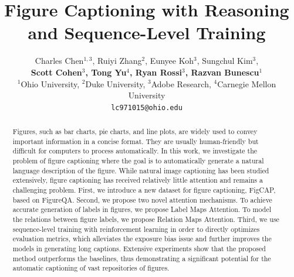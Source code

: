 \documentclass[11pt,a4paper]{article}
\title{Figure Captioning with Reasoning and Sequence-Level Training}
\author{Charles Chen$^{1,3}$, Ruiyi Zhang$^2$, Eunyee Koh$^3$, Sungchul Kim$^3$,\\ 
	\textbf{Scott Cohen$^3$, Tong Yu$^4$, Ryan Rossi$^3$, Razvan Bunescu$^1$}  \\
	$^1$Ohio University, $^2$Duke University, $^3$Adobe Research, $^4$Carnegie Mellon University \\
	{\tt lc971015@ohio.edu} \\}
\date{}
\begin{document}
\maketitle

\begin{abstract}
Figures, such as bar charts, pie charts, and line plots, are widely used to convey important information in a concise format. They are usually human-friendly but difficult for computers to process automatically. 
In this work, we investigate the problem of figure captioning where the goal is to automatically generate a natural language description of the figure. 
While natural image captioning has been studied extensively, figure captioning has received relatively little attention and remains a challenging problem.
First, we introduce a new dataset for figure captioning, FigCAP, based on FigureQA. Second, we propose two novel attention mechanisms. To achieve accurate generation of labels in figures, we propose Label Maps Attention. To model the relations between figure labels, we propose Relation Maps Attention.  Third, we use sequence-level training with reinforcement learning in order to directly optimizes evaluation metrics, which alleviates the exposure bias issue and further improves the models in generating long captions. Extensive experiments show that the proposed method outperforms the baselines, thus demonstrating a significant potential for the automatic captioning of vast repositories of figures.





\end{abstract}
\end{document}

